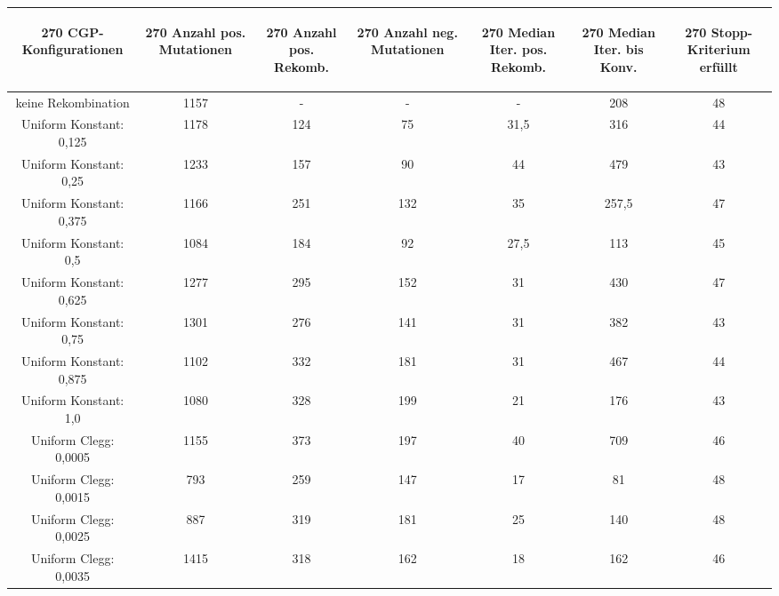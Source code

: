 \begin{table}[H]
	\centering
	\begin{tabular}{c | c | c | c | c | c | c}
		\begin{turn}{270} \textbf{CGP-Konfigurationen} \end{turn} & \begin{turn}{270} \textbf{Anzahl pos. Mutationen} \end{turn} & \begin{turn}{270} \textbf{Anzahl pos. Rekomb.} \end{turn} & \begin{turn}{270} \textbf{Anzahl neg. Mutationen} \end{turn} & \begin{turn}{270} \textbf{Median Iter. pos. Rekomb.} \end{turn} & \begin{turn}{270} \textbf{Median Iter. bis Konv.} \end{turn} & \begin{turn}{270} \textbf{Stopp-Kriterium erfüllt} \end{turn}\\
		\hline
		keine Rekombination & 1157 & - & - & - & 208 & 48\\
		\hline
		Uniform Konstant: 0,125 & 1178 & 124 & 75 & 31,5 & 316 & 44\\
		\hline
		Uniform Konstant: 0,25 & 1233 & 157 & 90 & 44 & 479 & 43\\
		\hline
		Uniform Konstant: 0,375 & 1166 & 251 & 132 & 35 & 257,5 & 47\\
		\hline
		Uniform Konstant: 0,5 & 1084 & 184 & 92 & 27,5 & 113 & 45\\
		\hline
		Uniform Konstant: 0,625 & 1277 & 295 & 152 & 31 & 430 & 47\\
		\hline
		Uniform Konstant: 0,75 & 1301 & 276 & 141 & 31 & 382 & 43\\
		\hline
		Uniform Konstant: 0,875 & 1102 & 332 & 181 & 31 & 467 & 44\\
		\hline
		Uniform Konstant: 1,0 & 1080 & 328 & 199 & 21 & 176 & 43\\
		\hline
		Uniform Clegg: 0,0005 & 1155 & 373 & 197 & 40 & 709 & 46\\
		\hline
		Uniform Clegg: 0,0015 & 793 & 259 & 147 & 17 & 81 & 48\\
		\hline
		Uniform Clegg: 0,0025 & 887 & 319 & 181 & 25 & 140 & 48\\
		\hline
		Uniform Clegg: 0,0035 & 1415 & 318 & 162 & 18 & 162 & 46\\

\end{tabular}
\end{table}
